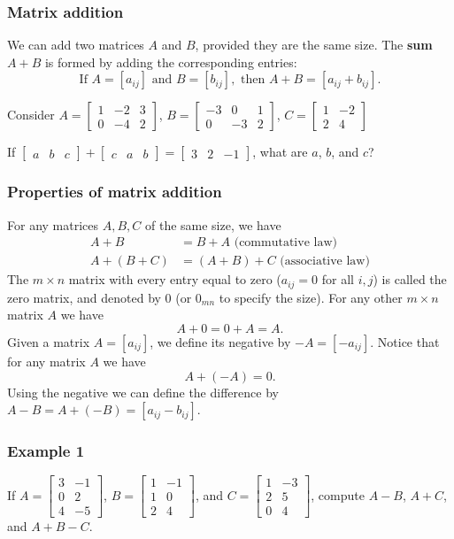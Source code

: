 \documentclass[12pt,t]{beamer}
\begin{document}
\begin{frame}\frametitle{Matrix addition}
 We can add two matrices $A$ and $B$, \alert{provided they are the same size}. The {\bf sum} $A+B$ is formed by adding the corresponding entries:
\[
 \text{If } A=[a_{ij}] \text{ and } B = [b_{ij}], \text{ then } A+B = [a_{ij}+b_{ij}].
\]
\begin{example}
 Consider $A =\begin{bmatrix}1&-2&3\\0&-4&2\end{bmatrix}$, $B = \begin{bmatrix}-3&0&1\\0&-3&2\end{bmatrix}$, $C = \begin{bmatrix}1&-2\\2&4\end{bmatrix}$
\end{example}
\begin{example}
 If $\begin{bmatrix}a&b&c\end{bmatrix}+\begin{bmatrix}c&a&b\end{bmatrix} = \begin{bmatrix}3&2&-1\end{bmatrix}$, what are $a$, $b$, and $c$?
\end{example}
\end{frame}
\begin{frame}\frametitle{Properties of matrix addition}
 For any matrices $A,B,C$ \alert{of the same size}, we have
\begin{align*}
 A+B & = B+A \text{ (commutative law)}\\
 A+(B+C) & = (A+B)+C \text{ (associative law)}
\end{align*}
 The $m\times n$ matrix with every entry equal to zero ($a_{ij}=0$ for all $i,j$) is called the \alert{zero matrix}, and denoted by $0$ (or $0_{mn}$ to specify the size). For any other $m\times n$ matrix $A$ we have
\[
 A+0 = 0+A = A.
\]
 Given a matrix $A = [a_{ij}]$, we define its \alert{negative} by $-A = [-a_{ij}]$. Notice that for any matrix $A$ we have
\[
 A+(-A) = 0.
\]
 Using the negative we can define the \alert{difference} by $A-B = A+(-B) = [a_{ij}-b_{ij}]$.
\end{frame}
\begin{frame}\frametitle{Example 1}
 If $A = \begin{bmatrix} 3 & -1\\ 0 &2\\  4 & -5\end{bmatrix}$, $B = \begin{bmatrix}1 & -1 \\ 1&0\\ 2&4\end{bmatrix}$, and $C = \begin{bmatrix}1&-3\\2&5\\0&4\end{bmatrix}$, compute $A-B$, $A+C$, and $A+B-C$.
\end{frame}
\end{document}
